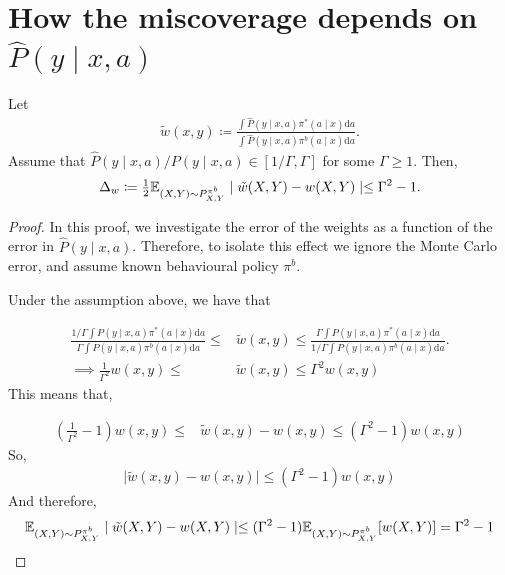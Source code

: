 \section{How the miscoverage depends on $\hat{P}(y\mid x, a)$}
\begin{proposition}
Let
\begin{align*}
    \tilde{w}(x, y) \coloneqq \frac{\int \hat{P}(y\mid x, a)\pi^*(a\mid x)\mathrm{d}a}{\int \hat{P}(y\mid x, a)\pi^b(a\mid x)\mathrm{d}a}.
\end{align*}
Assume that
$\hat{P}(y\mid x, a)/P(y\mid x, a) \in [1/\Gamma, \Gamma]$ for some $\Gamma \geq 1$.
Then, $$\Delta_w \coloneqq \tfrac{1}{2}\mathbb{E}_{(X,Y)\sim P^{\pi^b}_{X,Y}} \mid \tilde{w}(X,Y) - w(X,Y)\mid \leq \Gamma^2 - 1.$$
\end{proposition}
\begin{proof}
In this proof, we investigate the error of the weights as a function of the error in $\hat{P}(y\mid x, a)$. Therefore, to isolate this effect we ignore the Monte Carlo error, and assume known behavioural policy $\pi^b$.

Under the assumption above, we have that

\begin{align*}
    \frac{1/ \Gamma \int P(y\mid x, a)\pi^*(a\mid x)\mathrm{d}a}{\Gamma \int P(y\mid x, a)\pi^b(a\mid x)\mathrm{d}a} \leq &\tilde{w}(x, y) \leq \frac{\Gamma \int P(y\mid x, a)\pi^*(a\mid x)\mathrm{d}a}{1/\Gamma \int P(y\mid x, a)\pi^b(a\mid x)\mathrm{d}a}.\\
    \implies \frac{1}{\Gamma^2} w(x, y) \leq &\tilde{w}(x, y) \leq \Gamma^2 w(x, y)
\end{align*}
This means that, 

\begin{align*}
    \left(\frac{1}{\Gamma^2}-1 \right) w(x, y) \leq &\tilde{w}(x, y) - w(x, y) \leq (\Gamma^2 - 1) w(x, y)
\end{align*}
So, 
\begin{align*}
    \mid \tilde{w}(x, y) - w(x, y)\mid \leq (\Gamma^2 - 1) w(x, y)
\end{align*}
And therefore, 
\begin{align*}
    \mathbb{E}_{(X,Y)\sim P^{\pi^b}_{X,Y}} \mid \tilde{w}(X,Y) - w(X,Y)\mid \leq (\Gamma^2 - 1) \mathbb{E}_{(X,Y)\sim P^{\pi^b}_{X,Y}}[w(X, Y)] = \Gamma^2 - 1
\end{align*}
\end{proof}

